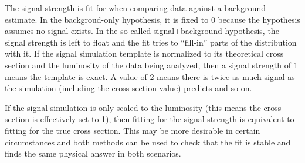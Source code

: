 The signal strength is fit for when comparing data against a background estimate. In the backgroud-only hypothesis, it is fixed to 0 because the hypothesis assumes no signal exists. In the so-called signal+background hypothesis, the signal strength is left to float and the fit tries to ``fill-in'' parts of the distribution with it. If the signal simulation template is normalized to its theoretical cross section and the luminosity of the data being analyzed, then a signal strength of 1 means the template is exact. A value of 2 means there is twice as much signal as the simulation (including the cross section value) predicts and so-on. 

If the signal simulation is only scaled to the luminosity (this means the cross section is effectively set to 1), then fitting for the signal strength is equivalent to fitting for the true cross section. This may be more desirable in certain circumstances and both methods can be used to check that the fit is stable and finds the same physical answer in both scenarios.


